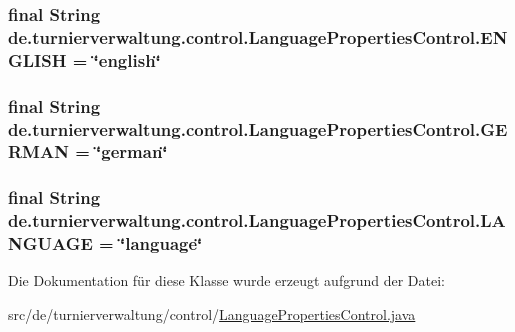 \subsubsection[{\texorpdfstring{E\+N\+G\+L\+I\+SH}{ENGLISH}}]{\setlength{\rightskip}{0pt plus 5cm}final String de.\+turnierverwaltung.\+control.\+Language\+Properties\+Control.\+E\+N\+G\+L\+I\+SH = \char`\"{}english\char`\"{}\hspace{0.3cm}{\ttfamily [static]}}\hypertarget{classde_1_1turnierverwaltung_1_1control_1_1_language_properties_control_ab9e9e73447fb3dd4934902a6b13b1456}{}\label{classde_1_1turnierverwaltung_1_1control_1_1_language_properties_control_ab9e9e73447fb3dd4934902a6b13b1456}
\subsubsection[{\texorpdfstring{G\+E\+R\+M\+AN}{GERMAN}}]{\setlength{\rightskip}{0pt plus 5cm}final String de.\+turnierverwaltung.\+control.\+Language\+Properties\+Control.\+G\+E\+R\+M\+AN = \char`\"{}german\char`\"{}\hspace{0.3cm}{\ttfamily [static]}}\hypertarget{classde_1_1turnierverwaltung_1_1control_1_1_language_properties_control_ad57a98d828bc9623e457ad5e87438192}{}\label{classde_1_1turnierverwaltung_1_1control_1_1_language_properties_control_ad57a98d828bc9623e457ad5e87438192}
\subsubsection[{\texorpdfstring{L\+A\+N\+G\+U\+A\+GE}{LANGUAGE}}]{\setlength{\rightskip}{0pt plus 5cm}final String de.\+turnierverwaltung.\+control.\+Language\+Properties\+Control.\+L\+A\+N\+G\+U\+A\+GE = \char`\"{}language\char`\"{}\hspace{0.3cm}{\ttfamily [static]}}\hypertarget{classde_1_1turnierverwaltung_1_1control_1_1_language_properties_control_a4997322c4c8e0433731c949f0bf45001}{}\label{classde_1_1turnierverwaltung_1_1control_1_1_language_properties_control_a4997322c4c8e0433731c949f0bf45001}


Die Dokumentation für diese Klasse wurde erzeugt aufgrund der Datei\+:\begin{DoxyCompactItemize}
\item 
src/de/turnierverwaltung/control/\hyperlink{_language_properties_control_8java}{Language\+Properties\+Control.\+java}\end{DoxyCompactItemize}
